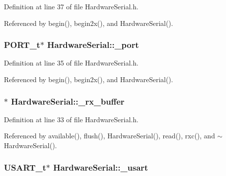 Definition at line 37 of file HardwareSerial.h.



Referenced by begin(), begin2x(), and HardwareSerial().

\hypertarget{class_hardware_serial_add54c7d986c6122e8e8c23303f5b4845}{
\subsubsection[{\_\-port}]{\setlength{\rightskip}{0pt plus 5cm}PORT\_\-t$\ast$ {\bf HardwareSerial::\_\-port}}}
\label{class_hardware_serial_add54c7d986c6122e8e8c23303f5b4845}


Definition at line 35 of file HardwareSerial.h.



Referenced by begin(), begin2x(), and HardwareSerial().

\hypertarget{class_hardware_serial_a9ee5f8b61e049f98dfd0b5ae53e97273}{
\subsubsection[{\_\-rx\_\-buffer}]{$\ast$ {\bf HardwareSerial::\_\-rx\_\-buffer}}}
\label{class_hardware_serial_a9ee5f8b61e049f98dfd0b5ae53e97273}


Definition at line 33 of file HardwareSerial.h.



Referenced by available(), flush(), HardwareSerial(), read(), rxc(), and $\sim$HardwareSerial().

\hypertarget{class_hardware_serial_a3a3bd56aa561ae7e1eb1fd252b5b69a0}{
\subsubsection[{\_\-usart}]{\setlength{\rightskip}{0pt plus 5cm}USART\_\-t$\ast$ {\bf HardwareSerial::\_\-usart}}}
\label{class_hardware_serial_a3a3bd56aa561ae7e1eb1fd252b5b69a0}



